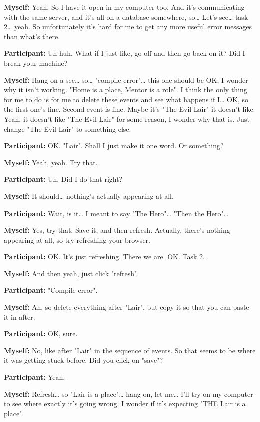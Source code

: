 \documentclass[11pt]{report}
\newcommand{\llabel}[1]{\hypertarget{llineno:#1}{\linelabel{#1}}}
\begin{document}
\begin{linenumbers}
\textbf{Myself:} Yeah. So I have it open in my computer too. And it's communicating with the same server, and it's all on a database somewhere, so\ldots{} Let's see\ldots{} task 2\ldots{} yeah. So unfortunately it's hard for me to get any more useful error messages than what's there.

\textbf{Participant:} Uh-huh. What if I just like, go off and then go back on it? Did I break your machine?

\textbf{Myself:} Hang on a sec\ldots{} so\ldots{} "compile error"\ldots{} this one should be OK, I wonder why it isn't working. "Home is a place, Mentor is a role". I think the only thing for me to do is for me to delete these events and see what happens if I\ldots{} OK, so the first one's fine. Second event is fine. Maybe it's "The Evil Lair" it doesn't like. Yeah, it doesn't like "The Evil Lair" for some reason, I wonder why that is. Just change "The Evil Lair" to something else.

\textbf{Participant:} OK. "Lair". Shall I just make it one word. Or something?

\textbf{Myself:} Yeah, yeah. Try that.

\textbf{Participant:} Uh. Did I do that right?

\textbf{Myself:} It should\ldots{} nothing's actually appearing at all.

\textbf{Participant:} Wait, is it\ldots{} I meant to say "The Hero"\ldots{} "Then the Hero"\ldots{}

\textbf{Myself:} Yes, try that. Save it, and then refresh. Actually, there's nothing appearing at all, so try refreshing your browser.

\textbf{Participant:} OK. It's just refreshing. There we are. OK. Task 2.

\textbf{Myself:} And then yeah, just click "refresh".

\textbf{Participant:} "Compile error".

\textbf{Myself:} Ah, so delete everything after "Lair", but copy it so that you can paste it in after.

\textbf{Participant:} OK, sure.

\textbf{Myself:} No, like after "Lair" in the sequence of events. So that seems to be where it was getting stuck before. Did you click on "save"?

\textbf{Participant:} Yeah.

\textbf{Myself:} Refresh\ldots{} so "Lair is a place"\ldots{} hang on, let
me\ldots{} I'll try on my computer to see where exactly it's going wrong. I
wonder if it's expecting "THE Lair is a place".\llabel{lne:syntax3e}


\end{linenumbers}
\end{document}
